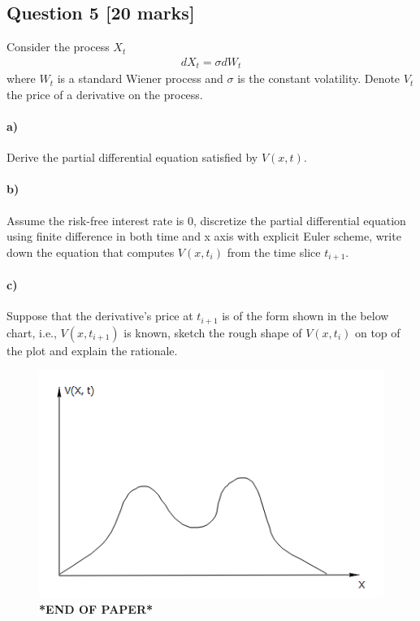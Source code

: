 \documentclass[11pt,a4paper,hidelinks,fleqn]{article}            %
\begin{document}
\subsection*{Question 5 [20 marks]}
Consider the process $X_t$
\begin{align*}
dX_t = \sigma dW_t
\end{align*}
where $W_t$ is a standard Wiener process and $\sigma$ is the constant volatility.
Denote $V_t$ the price of a derivative on the process.

\paragraph{a)} Derive the partial differential equation satisfied by $V(x, t)$.

\paragraph{b)} Assume the risk-free interest rate is 0,
discretize the partial differential equation using finite difference in both time and x axis with explicit Euler scheme,
write down the equation that computes $V(x, t_i)$ from the time slice $t_{i+1}$.

\paragraph{c)} Suppose that the derivative's price at $t_{i+1}$ is of the form shown in the below chart,
i.e., $V(x, t_{i+1})$ is known, 
sketch the rough shape of $V(x, t_{i})$ on top of the plot and explain the rationale.
\begin{figure}[h]
\includegraphics[scale=0.9]{./6c} \\
\vspace{1cm}
\textbf{*END OF PAPER*}
\end{figure}
\end{document}

